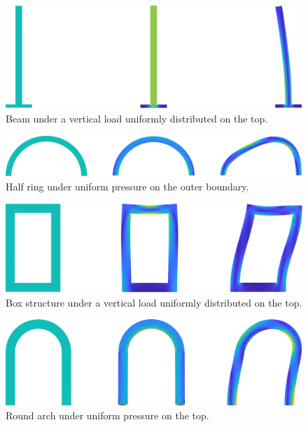 \documentclass[a4paper,11pt]{article}
\theoremstyle{definition}
\begin{document}
\begin{figure}[p]
\includegraphics[width=\textwidth]{../fem/examples/beam.pdf}
\caption{Beam under a vertical load uniformly distributed on the top.}
\end{figure}
\begin{figure}[p]
\includegraphics[width=\textwidth]{../fem/examples/halfring.pdf}
\caption{Half ring under uniform pressure on the outer boundary.}
\end{figure}
\begin{figure}[p]
\includegraphics[width=\textwidth]{../fem/examples/box.pdf}
\caption{Box structure under a vertical load uniformly distributed on the top.}
\end{figure}
\begin{figure}[p]
\includegraphics[width=\textwidth]{../fem/examples/roundarch.pdf}
\caption{Round arch under uniform pressure on the top.}
\end{figure}

\newpage
\nocite{antman}
\nocite{brezis}
\nocite{evans}
\printbibliography
\end{document}
